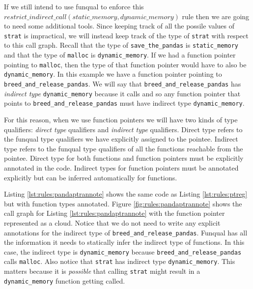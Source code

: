 \begin{sloppypar}
If we still intend to use funqual to enforce this $restrict\_indirect\_call(\allowbreak static\_memory, dynamic\_memory)$ rule then we are going to need some additional tools.  Since keeping track of all the possile values of \lstinline{strat} is impractical, we will instead keep track of the type of \lstinline{strat} with respect to this call graph.  Recall that the type of \lstinline{save_the_pandas} is \lstinline{static_memory} and that the type of \lstinline{malloc} is \lstinline{dynamic_memory}.  If we had a function pointer pointing to \lstinline{malloc}, then the type of that function pointer would have to also be \lstinline{dynamic_memory}.  In this example we have a function pointer pointing to \lstinline{breed_and_release_pandas}.  We will say that \lstinline{breed_and_release_pandas} has \textit{indirect type} \lstinline{dynamic_memory} because it calls  and so any function pointer that points to \lstinline{breed_and_release_pandas} must have indirect type \lstinline{dynamic_memory}.
\end{sloppypar}

For this reason, when we use function pointers we will have two kinds of type qualifiers:  \textit{direct type} qualifiers and \textit{indirect type} qualifiers.  Direct type refers to the funqual type qualifiers we have explicitly assigned to the pointee.  Indirect type refers to the funqual type qualifiers of all the functions reachable from the pointee.  Direct type for both functions and function pointers must be explicitly annotated in the code.  Indirect types for function pointers must be annotated explicitly but can be inferred automatically for functions. 

Listing \ref{lst:rules:pandaptrannote} shows the same code as Listing \ref{lst:rules:ptreg} but with function types annotated.  Figure \ref{fig:rules:pandaptrannote} shows the call graph for Listing \ref{lst:rules:pandaptrannote} with the function pointer represented as a cloud.  Notice that we do not need to write any explicit annotations for the indirect type of \lstinline{breed_and_release_pandas}.  Funqual has all the information it needs to statically infer the indirect type of functions.  In this case, the indirect type is \lstinline{dynamic_memory} because \lstinline{breed_and_release_pandas} calls \lstinline{malloc}.  Also notice that \lstinline{strat} has indirect type \lstinline{dynamic_memory}.  This matters because it is \textit{possible} that calling \lstinline{strat} might result in a \lstinline{dynamic_memory} function getting called.  

